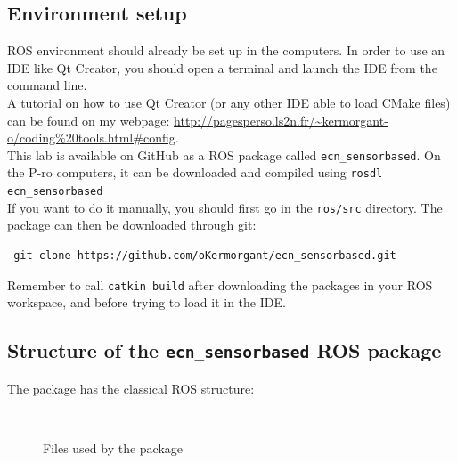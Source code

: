 \documentclass{ecnreport}
\begin{document}
\subsection{Environment setup}

ROS environment should already be set up in the computers. 
In order to use an IDE like Qt Creator, you should open a terminal and launch the IDE from the command line.\\ A tutorial on how to use Qt Creator (or any other IDE 
able to load CMake files) can be found on my webpage: \url{http://pagesperso.ls2n.fr/~kermorgant-o/coding\%20tools.html#config}.\\

This lab is available on GitHub as a ROS package called \texttt{ecn\_sensorbased}. 
On the P-ro computers, it can be downloaded and compiled using \texttt{rosdl ecn\_sensorbased}\\

If you want to do it manually, you should first go in the \texttt{ros/src} directory. The package can then be downloaded through git:
\begin{center}\cppstyle
\begin{lstlisting}
 git clone https://github.com/oKermorgant/ecn_sensorbased.git
\end{lstlisting}
\end{center}
Remember to call {\tt{catkin build}} after downloading the packages in your ROS workspace, and before trying to load it in the IDE.

\subsection{Structure of the \texttt{ecn\_sensorbased} ROS package}

The package has the classical ROS structure:
\begin{figure}[h]
\begin{minipage}{.25\linewidth} ~ \end{minipage}
\begin{minipage}{.5\linewidth}
\end{minipage}
\caption{Files used by the package}
\end{figure}
\end{document}
